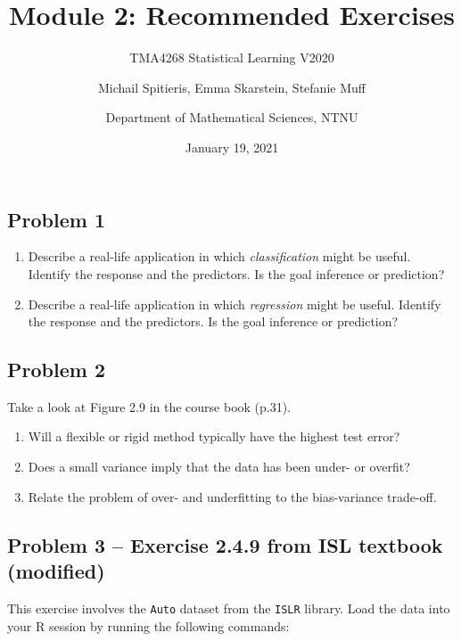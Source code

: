 \documentclass[]{article}
\title{Module 2: Recommended Exercises}
\subtitle{TMA4268 Statistical Learning V2020}
\author{Michail Spitieris, Emma Skarstein, Stefanie Muff \and Department of Mathematical Sciences, NTNU}
\date{January 19, 2021}
\providecommand{\tightlist}{%
  \setlength{\itemsep}{0pt}\setlength{\parskip}{0pt}}
\begin{document}
\maketitle

\hypertarget{problem-1}{%
\subsection{Problem 1}\label{problem-1}}

\begin{enumerate}
\def\labelenumi{\alph{enumi})}
\tightlist
\item
  Describe a real-life application in which \emph{classification} might
  be useful. Identify the response and the predictors. Is the goal
  inference or prediction?
\item
  Describe a real-life application in which \emph{regression} might be
  useful. Identify the response and the predictors. Is the goal
  inference or prediction?
\end{enumerate}

\hypertarget{problem-2}{%
\subsection{Problem 2}\label{problem-2}}

Take a look at Figure 2.9 in the course book (p.31).

\begin{enumerate}
\def\labelenumi{\alph{enumi})}
\tightlist
\item
  Will a flexible or rigid method typically have the highest test error?
\item
  Does a small variance imply that the data has been under- or overfit?
\item
  Relate the problem of over- and underfitting to the bias-variance
  trade-off.
\end{enumerate}

\hypertarget{problem-3-exercise-2.4.9-from-isl-textbook-modified}{%
\subsection{Problem 3 -- Exercise 2.4.9 from ISL textbook
(modified)}\label{problem-3-exercise-2.4.9-from-isl-textbook-modified}}

This exercise involves the \texttt{Auto} dataset from the \texttt{ISLR}
library. Load the data into your R session by running the following
commands:
\end{document}
